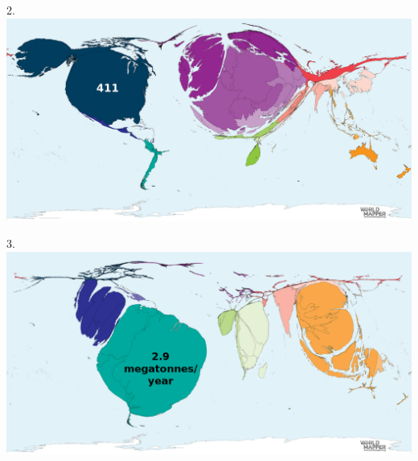\begin{frame}
\begin{center}
\Large
2. 
\\
\vspace{0.5em}\includegraphics[height=0.6\paperheight]{maps/picture_2.png}
\\
\end{center}
\end{frame}
\begin{frame}
\begin{center}
\Large
3. 
\\
\vspace{0.5em}\includegraphics[height=0.6\paperheight]{maps/picture_3.png}
\\
\end{center}
\end{frame}

